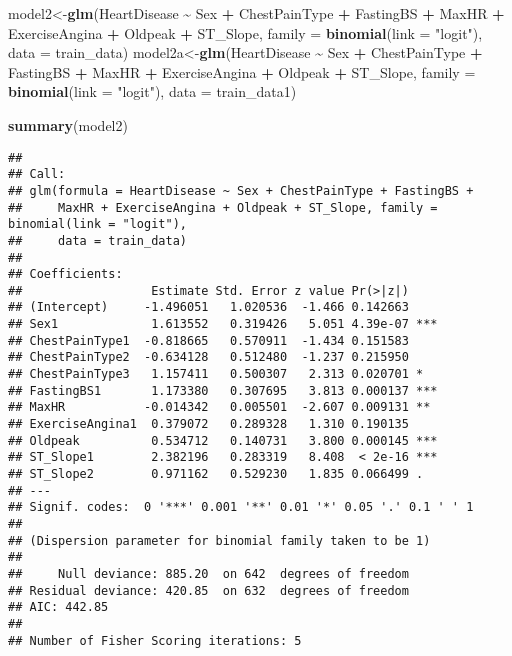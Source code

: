 \documentclass[
]{article}
\newenvironment{Shaded}{\begin{snugshade}}{\end{snugshade}}
\newcommand{\AttributeTok}[1]{\textcolor[rgb]{0.13,0.29,0.53}{#1}}
\newcommand{\FunctionTok}[1]{\textcolor[rgb]{0.13,0.29,0.53}{\textbf{#1}}}
\newcommand{\NormalTok}[1]{#1}
\newcommand{\OtherTok}[1]{\textcolor[rgb]{0.56,0.35,0.01}{#1}}
\newcommand{\SpecialCharTok}[1]{\textcolor[rgb]{0.81,0.36,0.00}{\textbf{#1}}}
\newcommand{\StringTok}[1]{\textcolor[rgb]{0.31,0.60,0.02}{#1}}
\begin{document}
\begin{Shaded}
\begin{Highlighting}[]
\NormalTok{model2}\OtherTok{\textless{}{-}}\FunctionTok{glm}\NormalTok{(HeartDisease }\SpecialCharTok{\textasciitilde{}}\NormalTok{ Sex }\SpecialCharTok{+}\NormalTok{ ChestPainType }\SpecialCharTok{+}\NormalTok{ FastingBS }\SpecialCharTok{+}\NormalTok{ MaxHR }\SpecialCharTok{+} 
\NormalTok{              ExerciseAngina }\SpecialCharTok{+}\NormalTok{ Oldpeak }\SpecialCharTok{+}\NormalTok{ ST\_Slope, }
            \AttributeTok{family =} \FunctionTok{binomial}\NormalTok{(}\AttributeTok{link =} \StringTok{"logit"}\NormalTok{), }\AttributeTok{data =}\NormalTok{ train\_data)}
\NormalTok{model2a}\OtherTok{\textless{}{-}}\FunctionTok{glm}\NormalTok{(HeartDisease }\SpecialCharTok{\textasciitilde{}}\NormalTok{ Sex }\SpecialCharTok{+}\NormalTok{ ChestPainType }\SpecialCharTok{+}\NormalTok{ FastingBS }\SpecialCharTok{+}\NormalTok{ MaxHR }\SpecialCharTok{+}
\NormalTok{               ExerciseAngina }\SpecialCharTok{+}\NormalTok{ Oldpeak }\SpecialCharTok{+}\NormalTok{ ST\_Slope, }
             \AttributeTok{family =} \FunctionTok{binomial}\NormalTok{(}\AttributeTok{link =} \StringTok{"logit"}\NormalTok{), }\AttributeTok{data =}\NormalTok{ train\_data1)}

\FunctionTok{summary}\NormalTok{(model2)}
\end{Highlighting}
\end{Shaded}

\begin{verbatim}
## 
## Call:
## glm(formula = HeartDisease ~ Sex + ChestPainType + FastingBS + 
##     MaxHR + ExerciseAngina + Oldpeak + ST_Slope, family = binomial(link = "logit"), 
##     data = train_data)
## 
## Coefficients:
##                  Estimate Std. Error z value Pr(>|z|)    
## (Intercept)     -1.496051   1.020536  -1.466 0.142663    
## Sex1             1.613552   0.319426   5.051 4.39e-07 ***
## ChestPainType1  -0.818665   0.570911  -1.434 0.151583    
## ChestPainType2  -0.634128   0.512480  -1.237 0.215950    
## ChestPainType3   1.157411   0.500307   2.313 0.020701 *  
## FastingBS1       1.173380   0.307695   3.813 0.000137 ***
## MaxHR           -0.014342   0.005501  -2.607 0.009131 ** 
## ExerciseAngina1  0.379072   0.289328   1.310 0.190135    
## Oldpeak          0.534712   0.140731   3.800 0.000145 ***
## ST_Slope1        2.382196   0.283319   8.408  < 2e-16 ***
## ST_Slope2        0.971162   0.529230   1.835 0.066499 .  
## ---
## Signif. codes:  0 '***' 0.001 '**' 0.01 '*' 0.05 '.' 0.1 ' ' 1
## 
## (Dispersion parameter for binomial family taken to be 1)
## 
##     Null deviance: 885.20  on 642  degrees of freedom
## Residual deviance: 420.85  on 632  degrees of freedom
## AIC: 442.85
## 
## Number of Fisher Scoring iterations: 5
\end{verbatim}
\end{document}
